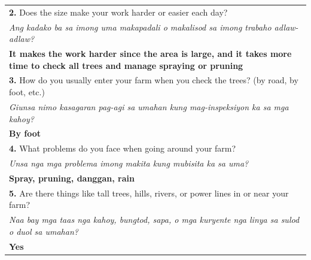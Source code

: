 \begin{longtable}{|p{4cm}|p{10cm}|}
		\multicolumn{2}{|p{12cm}|}{\vspace{0.1cm}  \textbf{2.} Does the size make your work harder or easier each day?}                                                                        \\
		\multicolumn{2}{|p{12cm}|}{\textit{Ang kadako ba sa imong uma makapadali o makalisod sa imong trabaho adlaw-adlaw?}}                                                                   \\
		\multicolumn{2}{|p{12cm}|}{\textbf{It makes the work harder since the area is large, and it takes more time to check all trees and manage spraying or pruning}}                        \\

		\multicolumn{2}{|p{12cm}|}{\vspace{0.1cm} \textbf{3.} How do you usually enter your farm when you check the trees? (by road, by foot, etc.)}                                           \\
		\multicolumn{2}{|p{12cm}|}{\textit{Giunsa nimo kasagaran pag-agi sa umahan kung mag-inspeksiyon ka sa mga kahoy?}}                                                                     \\
		\multicolumn{2}{|p{12cm}|}{\textbf{By foot}}                                                                                                                                           \\

		\multicolumn{2}{|p{12cm}|}{\vspace{0.1cm} \textbf{4.} What problems do you face when going around your farm?}                                                                          \\
		\multicolumn{2}{|p{12cm}|}{\textit{Unsa nga mga problema imong makita kung mubisita ka sa uma?}}                                                                                       \\
		\multicolumn{2}{|p{12cm}|}{\textbf{Spray, pruning, danggan, rain}}                                                                                                                     \\
		\multicolumn{2}{|p{12cm}|}{\vspace{0.1cm} \textbf{5.} Are there things like tall trees, hills, rivers, or power lines in or near your farm?}                                           \\
		\multicolumn{2}{|p{12cm}|}{\textit{Naa bay mga taas nga kahoy, bungtod, sapa, o mga kuryente nga linya sa sulod o duol sa umahan?}}                                                    \\
		\multicolumn{2}{|p{12cm}|}{\textbf{Yes}}                                                                                                                                               \\


\end{longtable}

